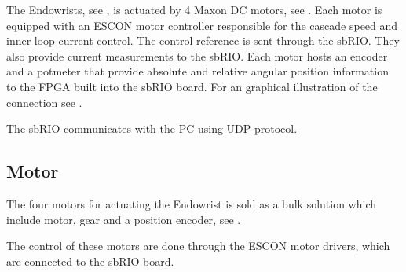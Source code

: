 The Endowrists, see , is actuated by 4 Maxon DC motors, see . Each motor is equipped with an ESCON motor controller responsible for the cascade speed and inner loop current control. The control reference is sent through the sbRIO. They also provide current measurements to the sbRIO. Each motor hosts an encoder and a potmeter that provide absolute and relative angular position information to the FPGA built into the sbRIO board. For an graphical illustration of the connection see .
 
The sbRIO communicates with the PC using UDP protocol. 




\subsection{Motor}\label{Maxon_Motor}
The four motors for actuating the Endowrist is sold as a bulk solution which include motor\cite{motor_motor}, gear\cite{motor_gear} and a position encoder\cite{motor_encoder}, see .

The control of these motors are done through the ESCON motor drivers, which are connected to the sbRIO board.


